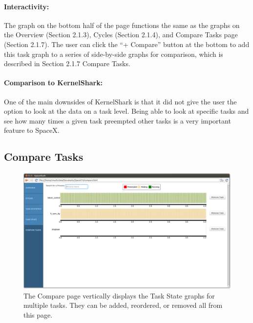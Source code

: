 \documentclass{hmcclinic}
\begin{document}
\paragraph{Interactivity:}
    The graph on the bottom half of the page functions the same as the graphs on the Overview (Section 2.1.3), Cycles (Section 2.1.4), and Compare Tasks page (Section 2.1.7). The user can click the ``+ Compare'' button at the bottom to add this task graph to a series of side-by-side graphs for comparison, which
    is described in Section 2.1.7 Compare Tasks.
    
\paragraph{Comparison to KernelShark:}
    One of the main downsides of KernelShark is that it did not give the user the option to look at the data on a task level. Being able to look at specific tasks and see how many times a given task preempted other tasks is a very important feature to SpaceX.
    
  
  \subsection{Compare Tasks} %
  
  \begin{figure}[H]
  \includegraphics[scale=0.25]{compare-page.png}
  \caption{The Compare page vertically displays the Task State graphs for
  multiple tasks. They can be added, reordered, or removed all from this page.}
  \end{figure}
\end{document}
